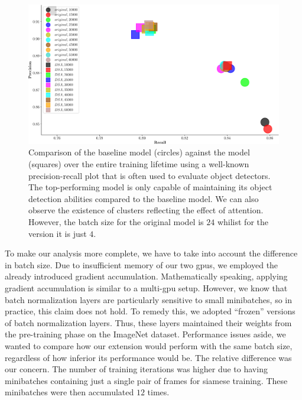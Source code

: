 \begin{figure}[t]
    \centerline{\includegraphics[width=\linewidth]{figures/siamese_tracking/tracker_cmp_160_2x12_vs_160_2x2_DSA_rec_prec.pdf}}
    \caption[\gls{dsa} evaluation - secondary metrics]{Comparison of the baseline model (circles) against the \dsamodel{} model (squares) over the entire training lifetime using a well-known precision-recall plot that is often used to evaluate object detectors. The top-performing \dsamodel{} model is only capable of maintaining its object detection abilities compared to the baseline model. We can also observe the existence of clusters reflecting the effect of attention. However, the batch size for the original model is $24$ whilist for the \dsamodel{} version it is just $4$.}
    \label{fig:OrigVsDSA_160RPN_Prec_Rec}
\end{figure}

To make our analysis more complete, we have to take into account the difference in batch size. Due to insufficient memory of our two \glspl{gpu}, we employed the already introduced gradient accumulation. Mathematically speaking, applying gradient accumulation is similar to a multi-\gls{gpu} setup. However, we know that batch normalization layers are particularly sensitive to small minibatches, so in practice, this claim does not hold. To remedy this, we adopted ``frozen'' versions of batch normalization layers. Thus, these layers maintained their weights from the pre-training phase on the ImageNet dataset. Performance issues aside, we wanted to compare how our extension would perform with the same batch size, regardless of how inferior its performance would be. The relative difference was our concern. The number of training iterations was higher due to having minibatches containing just a single pair of frames for siamese training. These minibatches were then accumulated $12$ times.

